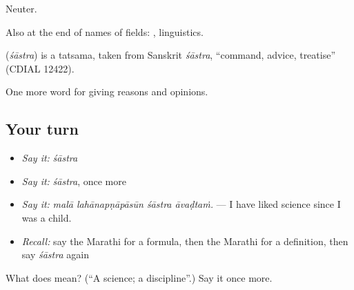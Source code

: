 Neuter.

Also at the end of names of fields: , linguistics.

\begin{cousinweb}
\textbf{} (\emph{śāstra}) is a tatsama, taken from Sanskrit \emph{śāstra}, \textquotedblleft{}command, advice, treatise\textquotedblright{} (CDIAL 12422).
\end{cousinweb}

\begin{grammarlens}[title={What you've built}]
One more word for giving reasons and opinions.
\end{grammarlens}

\subsection*{Your turn}
\begin{itemize}
\raggedright
  \item \emph{Say it:} \emph{śāstra}
  \item \emph{Say it:} \emph{śāstra}, once more
  \item \emph{Say it:} \emph{malā lahānapṇāpāsūn śāstra āvaḍtaṁ.} — I have liked science since I was a child.
  \item \emph{Recall:} say the Marathi for a formula, then the Marathi for a definition, then say \emph{śāstra} again
\end{itemize}

\begin{tcolorbox}[breakable,colback=teal!4,colframe=teal!35!black,title={Before you move on}]
What does  mean? (\textquotedblleft{}A science; a discipline\textquotedblright{}.) Say it once more.
\end{tcolorbox}
